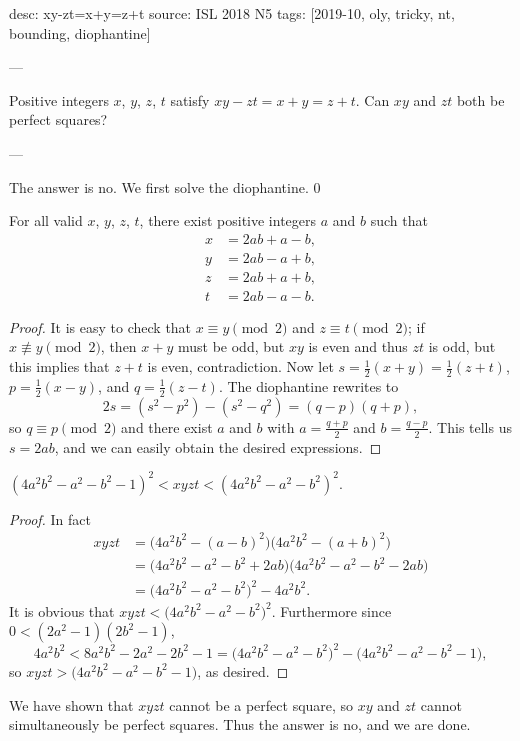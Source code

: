 desc: xy-zt=x+y=z+t
source: ISL 2018 N5
tags: [2019-10, oly, tricky, nt, bounding, diophantine]

---

Positive integers $x$, $y$, $z$, $t$ satisfy $xy-zt=x+y=z+t$. Can $xy$ and $zt$ both be perfect squares?

---

The answer is $\boxed{\text{no}}$. We first solve the diophantine.
\setcounter{claim}0
\begin{claim}
    For all valid $x$, $y$, $z$, $t$, there exist positive integers $a$ and $b$ such that
    \begin{align*}
        x&=2ab+a-b,\\
        y&=2ab-a+b,\\
        z&=2ab+a+b,\\
        t&=2ab-a-b.
    \end{align*}
\end{claim}
\begin{proof}
    It is easy to check that $x\equiv y\pmod2$ and $z\equiv t\pmod2$; if $x\not\equiv y\pmod2$, then $x+y$ must be odd, but $xy$ is even and thus $zt$ is odd, but this implies that $z+t$ is even, contradiction. Now let $s=\tfrac12(x+y)=\tfrac12(z+t)$, $p=\tfrac12(x-y)$, and $q=\tfrac12(z-t)$. The diophantine rewrites to \[2s=(s^2-p^2)-(s^2-q^2)=(q-p)(q+p),\]
    so $q\equiv p\pmod2$ and there exist $a$ and $b$ with $a=\tfrac{q+p}2$ and $b=\tfrac{q-p}2$. This tells us $s=2ab$, and we can easily obtain the desired expressions.
\end{proof}
\begin{claim}
    $(4a^2b^2-a^2-b^2-1)^2<xyzt<(4a^2b^2-a^2-b^2)^2$.
\end{claim}
\begin{proof}
    In fact
    \begin{align*}
        xyzt&=\big(4a^2b^2-(a-b)^2\big)\big(4a^2b^2-(a+b)^2\big)\\
        &=\big(4a^2b^2-a^2-b^2+2ab\big)\big(4a^2b^2-a^2-b^2-2ab\big)\\
        &=\big(4a^2b^2-a^2-b^2)^2-4a^2b^2.
    \end{align*}
    It is obvious that $xyzt<\big(4a^2b^2-a^2-b^2\big)^2$. Furthermore since $0<(2a^2-1)(2b^2-1)$, \[4a^2b^2<8a^2b^2-2a^2-2b^2-1=\big(4a^2b^2-a^2-b^2\big)^2-\big(4a^2b^2-a^2-b^2-1\big),\]
    so $xyzt>\big(4a^2b^2-a^2-b^2-1\big)$, as desired.
\end{proof}

We have shown that $xyzt$ cannot be a perfect square, so $xy$ and $zt$ cannot simultaneously be perfect squares. Thus the answer is no, and we are done.
